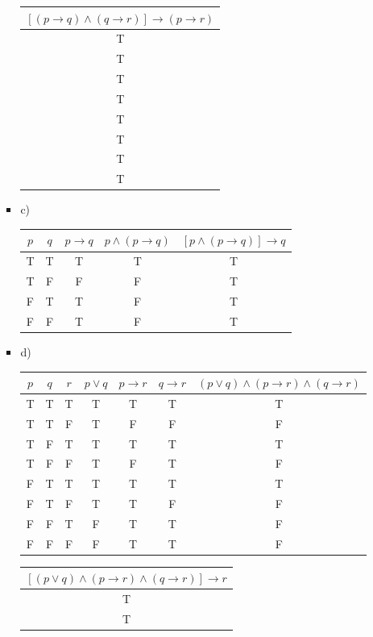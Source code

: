\documentclass[10pt,a4paper]{article}
\begin{document}
\begin{itemize}
\begin{itemize}
\begin{itemize}
      \begin{tabular}{|c|}
      \hline
        $[(p\to q)\land (q\to r)]\to (p\to r)$\\ \hline
        T\\
        T\\
        T\\
        T\\ \hline
        T\\
        T\\
        T\\
        T\\ \hline
      \end{tabular}
      \item c)
      \begin{tabular}{|c|c||c|c|c|}
        \hline
        $p$ 
        & $q$ 
        & $p\to q$ 
        & $p\land (p\to q)$ 
        & $[p\land (p\to q)]\to q $\\ \hline
        T & T & T & T & T \\
        T & F & F & F & T \\
        F & T & T & F & T \\
        F & F & T & F & T \\ \hline
      \end{tabular}
      \item d)
      \begin{tabular}{|c|c|c||c|c|c|c|}
        \hline
        $p$ 
        &$q$ 
        &$r$ 
        &$p\lor q$ 
        &$p\to r$ 
        &$q\to r$
        &$(p\lor q)\land(p\to r)\land(q\to r)$\\ \hline
        T & T & T & T & T & T & T\\
        T & T & F & T & F & F & F\\
        T & F & T & T & T & T & T\\
        T & F & F & T & F & T & F\\ \hline
        F & T & T & T & T & T & T\\
        F & T & F & T & T & F & F\\
        F & F & T & F & T & T & F\\
        F & F & F & F & T & T & F\\ \hline
      \end{tabular}
      \begin{tabular}{|c|}
      \hline $[(p\lor q)\land(p\to r)\land(q\to r)]\to r$\\ \hline
      T\\
      T\\

\end{tabular}
\end{itemize}
\end{itemize}
\end{itemize}
\end{document}
